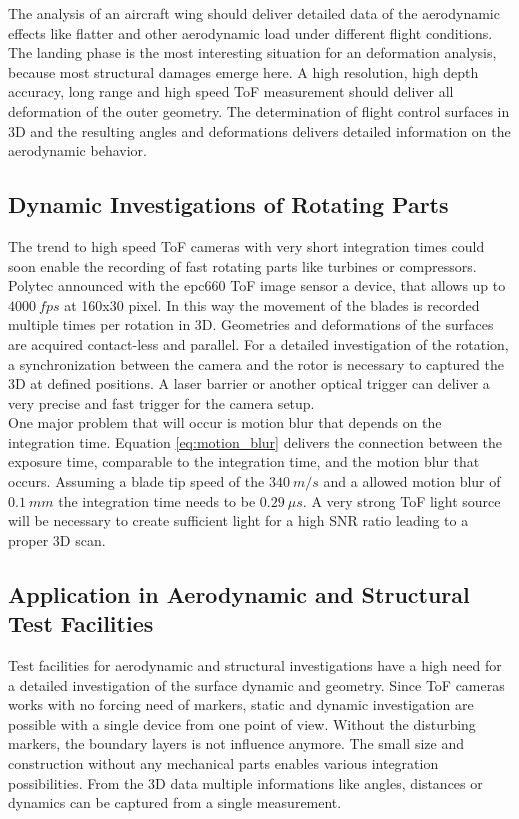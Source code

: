 The analysis of an aircraft wing should deliver detailed data of the aerodynamic effects like flatter and other aerodynamic load under different flight conditions. The landing phase is the most interesting situation for an deformation analysis, because most structural damages emerge here. A high resolution, high depth accuracy, long range and high speed ToF measurement should deliver all deformation of the outer geometry. The determination of flight control surfaces in 3D and the resulting angles and deformations delivers detailed information on the aerodynamic behavior.

\newpage

\subsection{Dynamic Investigations of Rotating Parts}
The trend to high speed ToF cameras with very short integration times could soon enable the recording of fast rotating parts like turbines or compressors. Polytec announced with the epc660 ToF image sensor a device, that allows up to $4000~fps$ at 160x30 pixel. In this way the movement of the blades is recorded multiple times per rotation in 3D. Geometries and deformations of the surfaces are acquired contact-less and parallel. For a detailed investigation of the rotation, a synchronization between the camera and the rotor is necessary to captured the 3D at defined positions. A laser barrier or another optical trigger can deliver a very precise and fast trigger for the camera setup.\\

One major problem that will occur is motion blur that depends on the integration time. Equation \ref{eq:motion_blur} delivers the connection between the exposure time, comparable to the integration time, and the motion blur that occurs. Assuming a blade tip speed of the $340~m/s$ and a allowed motion blur of $0.1~mm$ the integration time needs to be $0.29~\mu s$. A very strong ToF light source will be necessary to create sufficient light for a high SNR ratio leading to a proper 3D scan.

\subsection{Application in Aerodynamic and Structural Test Facilities}
Test facilities for aerodynamic and structural investigations have a high need for a detailed investigation of the surface dynamic and geometry. Since ToF cameras works with no forcing need of markers, static and dynamic investigation are possible with a single device from one point of view. Without the disturbing markers, the boundary layers is not influence anymore. The small size and construction without any mechanical parts enables various integration possibilities. From the 3D data multiple informations like angles, distances or dynamics can be captured from a single measurement.\\ 

